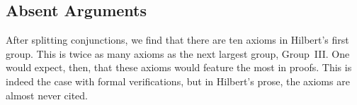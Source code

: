 
\subsection{Absent Arguments}
After splitting conjunctions, we find that there are ten axioms in Hilbert's first group. This is twice as many axioms as the next largest group, Group~III. One would expect, then, that these axioms would feature the most in proofs. This is indeed the case with formal verifications, but in Hilbert's prose, the axioms are almost never cited.

